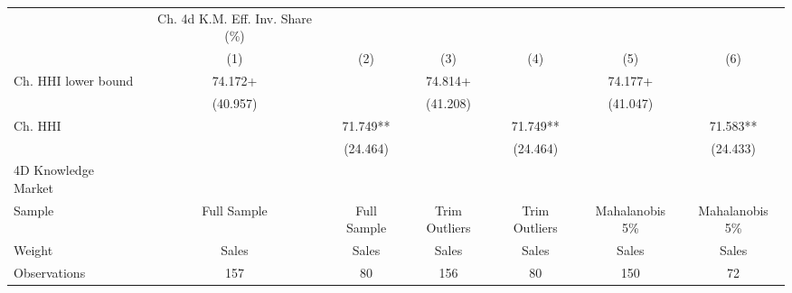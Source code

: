 {
\def\sym#1{\ifmmode^{#1}\else\(^{#1}\)\fi}
\begin{tabular}{l*{6}{c}}
\hline\hline
                    &Ch. 4d K.M. Eff. Inv. Share (\%)   &               &               &               &               &               \\
                    &\multicolumn{1}{c}{(1)}   &\multicolumn{1}{c}{(2)}   &\multicolumn{1}{c}{(3)}   &\multicolumn{1}{c}{(4)}   &\multicolumn{1}{c}{(5)}   &\multicolumn{1}{c}{(6)}   \\
\hline
Ch. HHI lower bound &      74.172+  &               &      74.814+  &               &      74.177+  &               \\
                    &    (40.957)   &               &    (41.208)   &               &    (41.047)   &               \\
Ch. HHI             &               &      71.749** &               &      71.749** &               &      71.583** \\
                    &               &    (24.464)   &               &    (24.464)   &               &    (24.433)   \\
\hline
4D Knowledge Market &               &               &               &               &               &               \\
Sample              & Full Sample   & Full Sample   &Trim Outliers   &Trim Outliers   &Mahalanobis 5\%   &Mahalanobis 5\%   \\
Weight              &       Sales   &       Sales   &       Sales   &       Sales   &       Sales   &       Sales   \\
Observations        &         157   &          80   &         156   &          80   &         150   &          72   \\
\hline\hline
\end{tabular}
}

